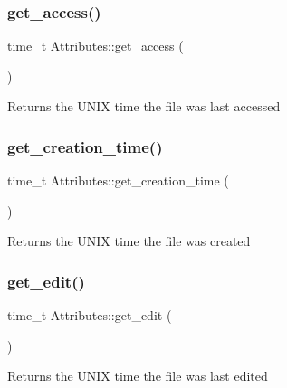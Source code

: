 \subsubsection{\texorpdfstring{get\+\_\+access()}{get\_access()}}
{\footnotesize\ttfamily time\+\_\+t Attributes\+::get\+\_\+access (\begin{DoxyParamCaption}{ }\end{DoxyParamCaption})}

\begin{DoxyReturn}{Returns}
the U\+N\+IX time the file was last accessed 
\end{DoxyReturn}
\mbox{\label{classAttributes_aeb0845464130e292875be4f8dcc51e8a}} 
\subsubsection{\texorpdfstring{get\+\_\+creation\+\_\+time()}{get\_creation\_time()}}
{\footnotesize\ttfamily time\+\_\+t Attributes\+::get\+\_\+creation\+\_\+time (\begin{DoxyParamCaption}{ }\end{DoxyParamCaption})}

\begin{DoxyReturn}{Returns}
the U\+N\+IX time the file was created 
\end{DoxyReturn}
\mbox{\label{classAttributes_a4ff80c2f3a31f86d874d7982354e4f70}} 
\subsubsection{\texorpdfstring{get\+\_\+edit()}{get\_edit()}}
{\footnotesize\ttfamily time\+\_\+t Attributes\+::get\+\_\+edit (\begin{DoxyParamCaption}{ }\end{DoxyParamCaption})}

\begin{DoxyReturn}{Returns}
the U\+N\+IX time the file was last edited 
\end{DoxyReturn}
\mbox{\label{classAttributes_a774666651c1d61cade39cc15cf03b9b2}} 
